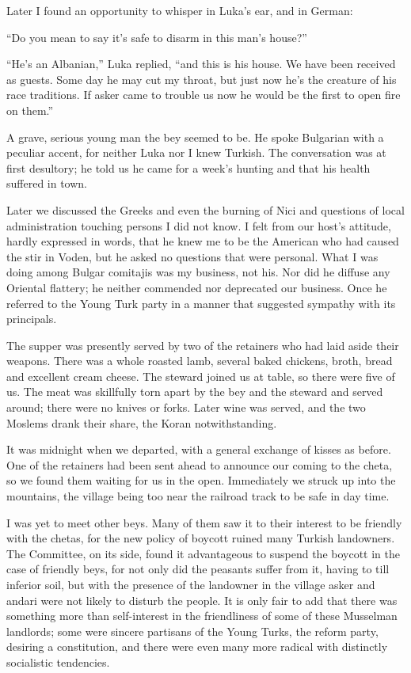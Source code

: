 \documentclass[a5paper,12pt]{book}
\begin{document}
Later I found an opportunity to whisper in Luka’s ear, and in German: 

“Do you mean to say it’s safe to disarm in this man’s house?” 

“He’s an Albanian,” Luka replied, “and this is his house. We have been received as guests. Some day he may cut my throat, but just now he’s the creature of his race traditions. If asker came to trouble us now he would be the first to open fire on them.” 

A grave, serious young man the bey seemed to be. He spoke Bulgarian with a peculiar accent, for neither Luka nor I knew Turkish. The conversation was at first desultory; he told us he came for a week’s hunting and that his health suffered in town.

Later we discussed the Greeks and even the burning of Nici and questions of local administration touching persons I did not know. I felt from our host’s attitude, hardly expressed in words, that he knew me to be the American who had caused the stir in Voden, but he asked no questions that were personal. What I was doing among Bulgar comitajis was my business, not his. Nor did he diffuse any Oriental flattery; he neither commended nor deprecated our business. Once he referred to the Young Turk party in a manner that suggested sympathy with its principals.

The supper was presently served by two of the retainers who had laid aside their weapons. There was a whole roasted lamb, several baked chickens, broth, bread and excellent cream cheese. The steward joined us at table, so there were five of us. The meat was skillfully torn apart by the bey and the steward and served around; there were no knives or forks. Later wine was served, and the two Moslems drank their share, the Koran notwithstanding.

It was midnight when we departed, with a general exchange of kisses as before. One of the retainers had been sent ahead to announce our coming to the cheta, so we found them waiting for us in the open. Immediately we struck up into the mountains, the village being too near the railroad track to be safe in day time.

I was yet to meet other beys. Many of them saw it to their interest to be friendly with the chetas, for the new policy of boycott ruined many Turkish landowners. The Committee, on its side, found it advantageous to suspend the boycott in the case of friendly beys, for not only did the peasants suffer from it, having to till inferior soil, but with the presence of the landowner in the village asker and andari were not likely to disturb the people. It is only fair to add that there was something more than self-interest in the friendliness of some of these Musselman landlords; some were sincere partisans of the Young Turks, the reform party, desiring a constitution, and there were even many more radical with distinctly socialistic tendencies.
\end{document}
